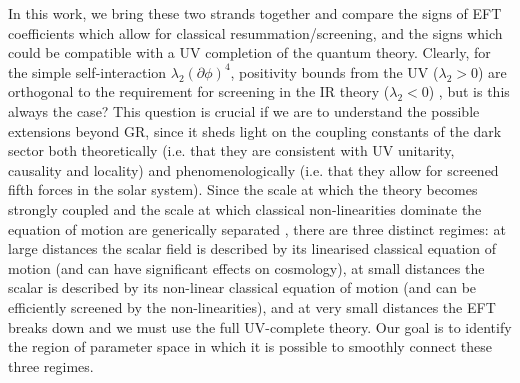 \documentclass[11pt]{article}
\begin{document}
In this work, we bring these two strands together and compare the signs of EFT coefficients which allow for classical resummation/screening, and the signs which could be compatible with a UV completion of the quantum theory. 
Clearly, for the simple self-interaction $\lambda_2 ( \partial \phi )^4$, positivity bounds from the UV ($\lambda_2 > 0$) are orthogonal to the requirement for screening in the IR theory ($\lambda_2 < 0$) \cite{Dvali:2012zc}, but is this always the case?  
This question is crucial if we are to understand the possible extensions beyond GR, since it sheds light on the coupling constants of the dark sector both theoretically (i.e. that they are consistent with UV unitarity, causality and locality) and phenomenologically (i.e. that they allow for screened fifth forces in the solar system). 
%
Since the scale at which the theory becomes strongly coupled and the scale at which classical non-linearities dominate the equation of motion are generically separated \cite{deRham:2014wfa}, there are three distinct regimes: at large distances the scalar field is described by its linearised classical equation of motion (and can have significant effects on cosmology), at small distances the scalar is described by its non-linear classical equation of motion (and can be efficiently screened by the non-linearities), and at very small distances the EFT breaks down and we must use the full UV-complete theory.  
Our goal is to identify the region of parameter space in which it is possible to smoothly connect these three regimes. 
%

~
\end{document}
